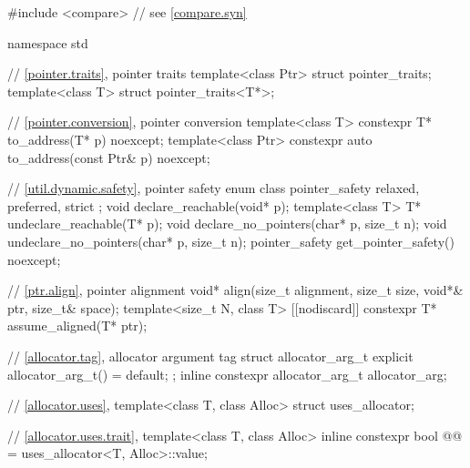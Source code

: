 \begin{codeblock}
#include <compare>              // see \ref{compare.syn}

namespace std {
  // \ref{pointer.traits}, pointer traits
  template<class Ptr> struct pointer_traits;
  template<class T> struct pointer_traits<T*>;

  // \ref{pointer.conversion}, pointer conversion
  template<class T>
    constexpr T* to_address(T* p) noexcept;
  template<class Ptr>
    constexpr auto to_address(const Ptr& p) noexcept;

  // \ref{util.dynamic.safety}, pointer safety%
%
%
%
  enum class pointer_safety { relaxed, preferred, strict };
  void declare_reachable(void* p);
  template<class T>
    T* undeclare_reachable(T* p);
  void declare_no_pointers(char* p, size_t n);
  void undeclare_no_pointers(char* p, size_t n);
  pointer_safety get_pointer_safety() noexcept;

  // \ref{ptr.align}, pointer alignment
  void* align(size_t alignment, size_t size, void*& ptr, size_t& space);
  template<size_t N, class T>
    [[nodiscard]] constexpr T* assume_aligned(T* ptr);

  // \ref{allocator.tag}, allocator argument tag
  struct allocator_arg_t { explicit allocator_arg_t() = default; };
  inline constexpr allocator_arg_t allocator_arg{};

  // \ref{allocator.uses}, 
  template<class T, class Alloc> struct uses_allocator;

  // \ref{allocator.uses.trait}, 
  template<class T, class Alloc>
    inline constexpr bool @@ = uses_allocator<T, Alloc>::value;

}
\end{codeblock}
